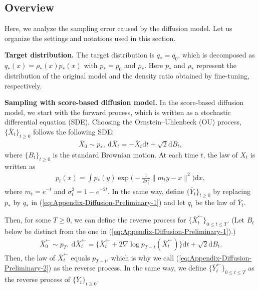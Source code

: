 

\subsection{Overview}
Here, we analyze the sampling error caused by the diffusion model. Let us organize the settings and notations used in this section.

{\bf Target distribution.} The target distribution is $q_*=q_0$, which is decomposed as $q_*(x) = \rho_*(x) p_*(x)$ with $p_*=p_0$ and $\rho_*$. 
Here $p_*$ and $\rho_*$ represent the distribution of the original model and the density ratio obtained by fine-tuning, respectively. 

{\bf Sampling with score-based diffusion model.} In the score-based diffusion model, we start with the forward process, which is written as a stochastic differential equation (SDE).
Choosing the Ornstein–Uhlenbeck (OU) process, $\{\bar{X}_t\}_{t\geq 0}$ follows the following SDE:
\begin{align}
    \bar{X}_0 \sim p_*,\ \mathrm{d}\bar{X}_t = - \bar{X}_t\mathrm{d}t + \sqrt{2}\mathrm{d}B_t,
    \label{eq:Appendix-Diffusion-Preliminary-1}
\end{align}
where $\{B_t\}_{t\geq 0}$ is the standard Brownian motion.
At each time $t$, the law of $X_t$ is written as
\begin{align}
\label{eq:Appendix-Diffusion-Preliminary-3}
    p_t(x) = \int p_*(y)\exp\bigg(-\frac{1}{2\sigma_t^2}\|m_t y - x\|^2\bigg)\mathrm{d}x,
\end{align}
where $m_t = e^{-t}$ and $\sigma_t^2 = 1 - e^{-2t}$. 
In the same way, define $\{\bar{Y}_t\}_{t\geq 0}$ by replacing $p_*$ by $q_*$ in (\ref{eq:Appendix-Diffusion-Preliminary-1}) and let $q_t$ be the law of $\bar{Y}_t$. 

Then, for some $T\geq 0$, we can define the reverse process for $\{\bar{X}_{t}^\leftarrow\}_{0\leq t \leq T}$. (Let $B_t$ below be distinct from the one in (\ref{eq:Appendix-Diffusion-Preliminary-1}).)
\begin{align}
\label{eq:Appendix-Diffusion-Preliminary-2}
    \bar{X}_{0}^\leftarrow\sim p_{T},\ \mathrm{d}\bar{X}_{t}^\leftarrow = \{\bar{X}_{t}^\leftarrow + 2\nabla \log p_{T-t}(\bar{X}_{t}^\leftarrow)\}\mathrm{d}t + \sqrt{2}\mathrm{d}B_t.
\end{align}
Then, the law of $\bar{X}_{t}^\leftarrow$ equals $p_{T-t}$, which is why we call (\ref{eq:Appendix-Diffusion-Preliminary-2}) as the reverse process.
In the same way, we define $\{\bar{Y}_{t}^\leftarrow\}_{0\leq t \leq T}$ as the reverse process of $\{\bar{Y}_{t}\}_{t\geq 0}$. 

